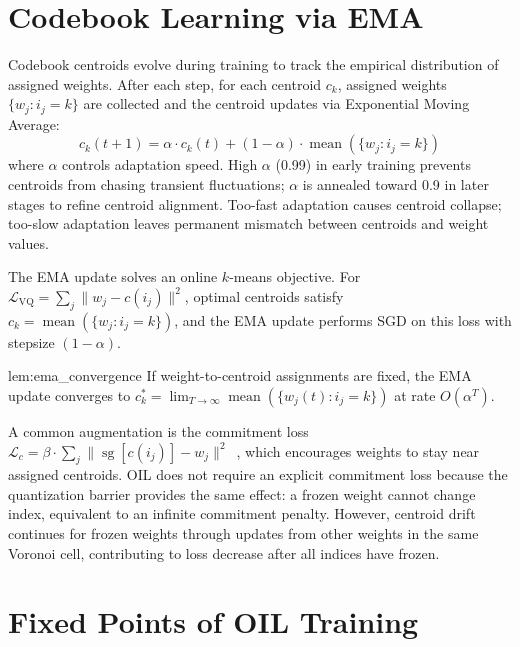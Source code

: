 \section{Codebook Learning via EMA}
\label{sec:codebook_ema}

Codebook centroids evolve during training to track the empirical
distribution of assigned weights.  After each step, for each centroid
$c_k$, assigned weights $\{w_j : i_j = k\}$ are collected and the
centroid updates via Exponential Moving Average:
\begin{equation}
c_k(t+1) = \alpha \cdot c_k(t) + (1 - \alpha) \cdot
\operatorname{mean}(\{w_j : i_j = k\})
\label{eq:ema_update}
\end{equation}
where $\alpha$ controls adaptation speed.  High $\alpha$ (0.99) in early
training prevents centroids from chasing transient fluctuations; $\alpha$
is annealed toward 0.9 in later stages to refine centroid alignment.
Too-fast adaptation causes centroid collapse; too-slow adaptation leaves
permanent mismatch between centroids and weight values.

The EMA update solves an online $k$-means objective.  For
$\mathcal{L}_{\text{VQ}} = \sum_j \|w_j - c(i_j)\|^2$, optimal centroids
satisfy $c_k = \operatorname{mean}(\{w_j : i_j = k\})$, and the EMA update
performs SGD on this loss with stepsize $(1-\alpha)$.

\begin{mylemma}{lem:ema_convergence}
If weight-to-centroid assignments are fixed, the EMA update converges to
$c_k^* = \lim_{T \to \infty} \operatorname{mean}(\{w_j(t) : i_j = k\})$
at rate $O(\alpha^T)$.
\end{mylemma}

A common augmentation is the commitment loss $\mathcal{L}_c = \beta \cdot
\sum_j \|\operatorname{sg}[c(i_j)] - w_j\|^2$~\cite{van2017neural}, which
encourages weights to stay near assigned centroids.  OIL does not require
an explicit commitment loss because the quantization barrier provides the
same effect: a frozen weight cannot change index, equivalent to an
infinite commitment penalty.  However, centroid drift continues for frozen
weights through updates from other weights in the same Voronoi cell,
contributing to loss decrease after all indices have frozen.

\section{Fixed Points of OIL Training}
\label{sec:fixed_points}


